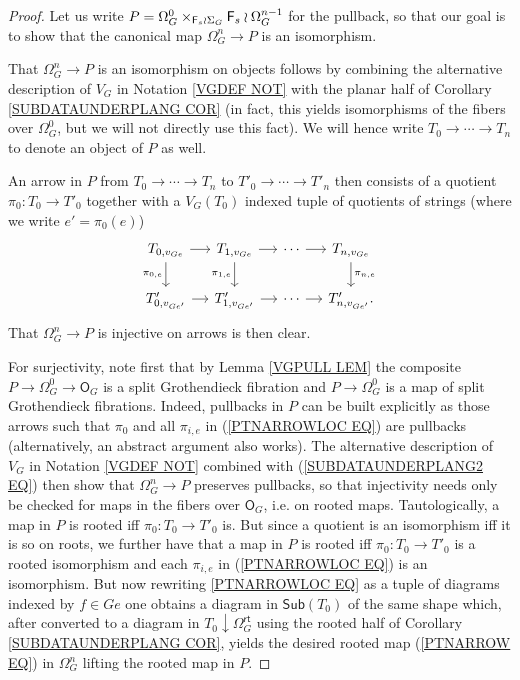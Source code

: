 \documentclass[a4paper,10pt]{article}%
\begin{document}
\begin{proof}
Let us write 
$P = \Omega_{G}^{0} \times_{\mathsf{F}_s \wr \Sigma_G} \mathsf{F}_s \wr \Omega_{G}^{n-1}$ for the pullback,
so that our goal is to show that the canonical map
$\Omega_{G}^{n} \to P$ is an isomorphism. 

That $\Omega_{G}^{n} \to P$ is an isomorphism on objects 
follows by combining the alternative description of $V_G$
in Notation \ref{VGDEF NOT} with the planar half of
Corollary \ref{SUBDATAUNDERPLANG COR}
(in fact, this yields isomorphisms of the fibers over 
$\Omega_{G}^{0}$, but we will not directly use this fact).
We will hence write $T_0 \to \cdots \to T_n$
to denote an object of $P$ as well.

An arrow in $P$ from 
$T_0 \to \cdots \to T_n$ to 
$T'_0 \to \cdots \to T'_n$
then consists of a quotient 
$\pi_0 \colon T_0 \to T'_0$
together with a $V_G(T_0)$ indexed tuple of quotients of strings (where we write $e'=\pi_0(e)$)
\begin{equation} \label{PTNARROWLOC EQ}
\begin{tikzcd}[column sep=1.2em]
	T_{0,v_{G e}} \ar{r}{} \ar{d}[swap]{\pi_{0,e}} & 
	T_{1,v_{G e}} \ar{r}{} \ar{d}[swap]{\pi_{1,e}} &
	\cdots \ar{r}{} &
	T_{n,v_{G e}} \ar{d}{\pi_{n,e}}
\\
	T'_{0,v_{G e'}} \ar{r}{} &
	T'_{1,v_{G e'}} \ar{r}{} &
	\cdots \ar{r}{} &
	T'_{n,v_{G e'}}.
\end{tikzcd}	
\end{equation}
That $\Omega_{G}^{n} \to P$ is injective on arrows is then clear.

For surjectivity, note first that by Lemma \ref{VGPULL LEM} the composite $P \to \Omega_{G}^{0} \to \mathsf{O}_G$
is a split Grothendieck fibration and 
$P \to \Omega_{G}^{0}$ is a map of split Grothendieck fibrations. 
Indeed, pullbacks in $P$ can be built explicitly as those arrows such that $\pi_0$ and all $\pi_{i,e}$ in 
(\ref{PTNARROWLOC EQ})
are pullbacks (alternatively, an abstract argument also works).
The alternative description of $V_G$ in 
Notation \ref{VGDEF NOT} combined with
(\ref{SUBDATAUNDERPLANG2 EQ}) 
then show that 
$\Omega_{G}^{n} \to P$ preserves pullbacks,
so that injectivity needs only be checked for maps in the fibers over $\mathsf{O}_G$, i.e. on rooted maps.
Tautologically, a map in $P$ is rooted iff $\pi_0 \colon T_0 \to T'_0$ is.
But since a quotient is an isomorphism iff it is so on roots,
we further have that 
a map in $P$ is rooted iff $\pi_0 \colon T_0 \to T'_0$
is a rooted isomorphism and
each $\pi_{i,e}$ in (\ref{PTNARROWLOC EQ}) is an isomorphism.
But now rewriting \ref{PTNARROWLOC EQ} as a tuple of diagrams indexed by
$f \in G e$
one obtains a diagram in $\mathsf{Sub}(T_0)$ of the same shape  which, after converted to a diagram in 
$T_0 \downarrow \Omega_G^{\mathsf{rt}}$
using the rooted half of Corollary \ref{SUBDATAUNDERPLANG COR},
yields the desired rooted map (\ref{PTNARROW EQ})
in $\Omega_{G}^{n}$ lifting the rooted map in $P$.
\end{proof}
\end{document}
